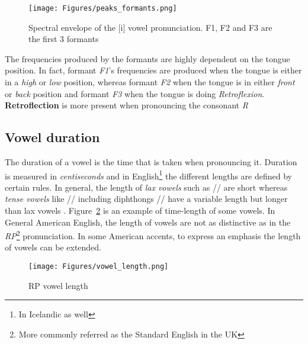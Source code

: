 \begin{figure}[!ht]
    \centering
    \texttt{[image: Figures/peaks\_formants.png]}
    \caption{Spectral envelope of the [i] vowel pronunciation. F1, F2 and F3 are the first 3 formants \cite{formants_peaks}}
    \label{fig:peaks_formants}
\end{figure}

\noindent The frequencies produced by the formants are highly dependent on the tongue position. In fact, formant \textit{F1}'s frequencies are produced when the tongue is either in a \textit{high} or \textit{low} position, whereas formant \textit{F2} when the tongue is in either \textit{front} or \textit{back} position and formant \textit{F3} when the tongue is doing \textit{Retroflexion}. \textbf{Retroflection} is more present when pronouncing the consonant \textit{R}


\subsection{Vowel duration}
\label{sub:vowel_duration}
The duration of a vowel is the time that is taken when pronouncing it. Duration is measured in \textit{centiseconds} and in English\footnote{In Icelandic as well} the different lengths are defined by certain rules. In general, the length of \textit{lax vowels} such as // are short whereas \textit{tense vowels} like // including diphthongs // have a variable length but longer than lax vowels \cite{vowel_length}. Figure~\ref{fig:vowel_length} is an example of time-length of some vowels.
\noindent In General American English, the length of vowels are not as distinctive as in the \textit{RP}\footnote{More commonly referred as the Standard English in the UK} pronunciation. In some American accents, to express an emphasis the length of vowels can be extended.

\begin{figure}[!ht]
    \centering
    \texttt{[image: Figures/vowel\_length.png]}
    \caption{RP vowel length \cite{vowel_length}}
    \label{fig:vowel_length}
\end{figure}


